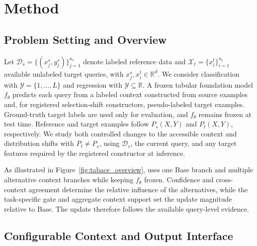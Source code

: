 \section{Method}
\label{sec:method}

\subsection{Problem Setting and Overview}

Let $\mathcal D_s=\{(x_j^s,y_j^s)\}_{j=1}^{n_s}$ denote labeled reference
data and $\mathcal X_t=\{x_i^t\}_{i=1}^{n_t}$ available unlabeled target queries, with
$x_j^s,x_i^t\in\mathbb R^d$. We consider classification with
$\mathcal Y=\{1,\ldots,L\}$ and regression with $\mathcal Y\subseteq\mathbb R$.
A frozen tabular foundation model
$f_\theta$ predicts each query from a labeled context constructed from
source examples and, for registered selection-shift constructors,
pseudo-labeled target examples. Ground-truth target labels are used only for
evaluation, and $f_\theta$ remains frozen at test time.
Reference and target examples follow $P_s(X,Y)$ and $P_t(X,Y)$, respectively.
We study both controlled changes to the accessible context and distribution
shifts with $P_t\neq P_s$, using $\mathcal D_s$, the current query, and any
target features required by the registered constructor at inference.

As illustrated in Figure~\ref{fig:tabace_overview}, \method{} uses one Base
branch and multiple alternative context branches while keeping $f_\theta$
frozen. Confidence and cross-context agreement determine the relative influence
of the alternatives, while the task-specific gate and aggregate context support
set the update magnitude relative to Base. The update therefore follows the
available query-level evidence.

\subsection{Configurable Context and Output Interface}
\label{sec:context_interface}

